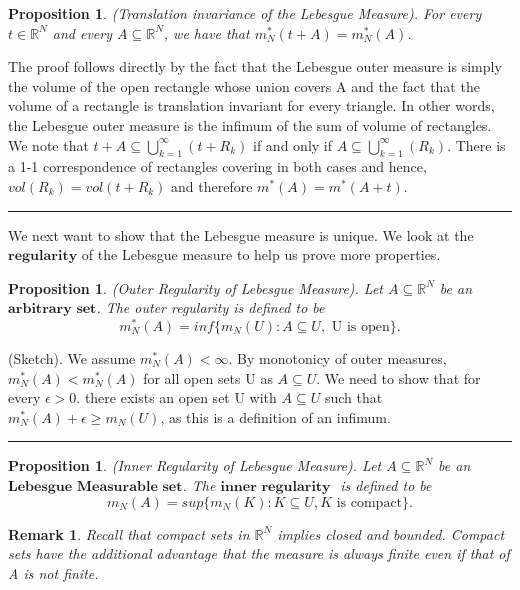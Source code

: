 \documentclass[twoside]{article}
\newtheorem{proposition}[theorem]{Proposition}
\newtheorem{remark}[theorem]{Remark}
\newenvironment{proof}{{\bf Proof:}}{\hfill\rule{2mm}{2mm}}
\begin{document}
\begin{proposition}
(Translation invariance of the Lebesgue Measure). For every $t \in \mathbb{R}^N$ and every $A \subseteq \mathbb{R}^N$, we have that $m_N^*(t + A) = m_N^*(A)$. 
\end{proposition}

\begin{proof}
The proof follows directly by the fact that the Lebesgue outer measure is simply the volume of the open rectangle whose union covers A and the fact that the volume of a rectangle is translation invariant for every triangle. In other words, the Lebesgue outer measure is the infimum of the sum of volume of rectangles. We note that $t + A \subseteq \bigcup_{k=1}^{\infty}(t + R_k)$ if and only if $A \subseteq \bigcup_{k=1}^{\infty}(R_k)$. There is a 1-1 correspondence of rectangles covering in both cases and hence, $vol(R_k) = vol(t + R_k)$ and therefore $m^*(A) = m^*(A + t)$.
\end{proof}

We next want to show that the Lebesgue measure is unique. We look at the $\textbf{regularity}$ of the Lebesgue measure to help us prove more properties.

\begin{proposition}
(Outer Regularity of Lebesgue Measure). Let $A \subseteq \mathbb{R}^N$ be an $\textbf{arbitrary set}$. The outer regularity is defined to be
$$
m_N^*(A) = inf\{m_N(U): A \subseteq U,\text{ U is open}\}.
$$
\end{proposition}

\begin{proof}
(Sketch). We assume $m_N^*(A) < \infty$. By monotonicy of outer measures, $m_N^*(A) < m_N^*(A)$ for all open sets U as $A \subseteq U$. We need to show that for every $\epsilon > 0$. there exists an open set U with $A \subseteq U$ such that $m_N^*(A) + \epsilon \geq m_N(U)$, as this is a definition of an infimum.
\end{proof}

\begin{proposition}
(Inner Regularity of Lebesgue Measure). Let $A \subseteq \mathbb{R}^N$ be an $\textbf{Lebesgue Measurable set}$. The $\textbf{inner regularity }$ is defined to be
$$
m_N(A) = sup\{m_N(K): K \subseteq U, K \text{ is compact}\}.
$$
\end{proposition}

\begin{remark}
Recall that compact sets in $\mathbb{R}^N$ implies closed and bounded. Compact sets have the additional advantage that the measure is always finite even if that of A is not finite.
\end{remark}
\end{document}
